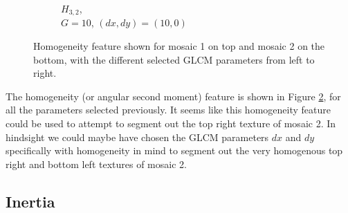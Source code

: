 \documentclass[a4paper]{article}
\begin{document}
\begin{figure}
\begin{subfigure}[b]{0.30\textwidth}
        \caption{%
            $H_{3,2}$, \\
            $G=10$, $(dx, dy)=(10,0)$
        }
        \label{fig:h32}
    \end{subfigure}

    \caption{%
        Homogeneity feature shown for mosaic 1 on top and mosaic 2 on
        the bottom, with the different selected GLCM parameters from
        left to right.
    }
    \label{fig:hom}
\end{figure}

The homogeneity (or angular second moment) feature is shown in Figure
\ref{fig:hom}, for all the parameters selected previously. It seems like
this homogeneity feature could be used to attempt to segment out the top
right texture of mosaic 2. In hindsight we could maybe have chosen the
GLCM parameters $dx$ and $dy$ specifically with homogeneity in mind to
segment out the very homogenous top right and bottom left textures of
mosaic 2.

\subsection{Inertia}
\end{document}
